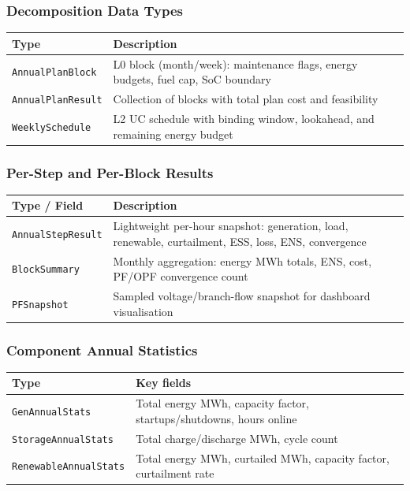 \subsubsection{Decomposition Data Types}

\begin{center}
\begin{tabular}{ll}
\hline\hline
\textbf{Type} & \textbf{Description} \\
\hline
\texttt{AnnualPlanBlock} & L0 block (month/week): maintenance flags, energy budgets, fuel cap, SoC boundary \\
\texttt{AnnualPlanResult} & Collection of blocks with total plan cost and feasibility \\
\texttt{WeeklySchedule} & L2 UC schedule with binding window, lookahead, and remaining energy budget \\
\hline\hline
\end{tabular}
\end{center}

\subsubsection{Per-Step and Per-Block Results}

\begin{center}
\begin{tabular}{ll}
\hline\hline
\textbf{Type / Field} & \textbf{Description} \\
\hline
\texttt{AnnualStepResult} & Lightweight per-hour snapshot: generation, load, renewable, curtailment, ESS, loss, ENS, convergence \\
\texttt{BlockSummary} & Monthly aggregation: energy MWh totals, ENS, cost, PF/OPF convergence count \\
\texttt{PFSnapshot} & Sampled voltage/branch-flow snapshot for dashboard visualisation \\
\hline\hline
\end{tabular}
\end{center}

\subsubsection{Component Annual Statistics}

\begin{center}
\begin{tabular}{ll}
\hline\hline
\textbf{Type} & \textbf{Key fields} \\
\hline
\texttt{GenAnnualStats} & Total energy MWh, capacity factor, startups/shutdowns, hours online \\
\texttt{StorageAnnualStats} & Total charge/discharge MWh, cycle count \\
\texttt{RenewableAnnualStats} & Total energy MWh, curtailed MWh, capacity factor, curtailment rate \\
\hline\hline
\end{tabular}
\end{center}

